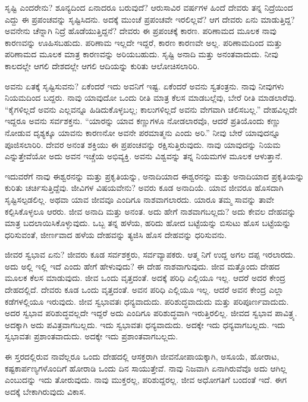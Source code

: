 \vskip 2pt

ಸೃಷ್ಟಿ ಎಂದರೇನು? ಶೂನ್ಯದಿಂದ ಏನಾದರೂ ಬರುವುದೆ? ಆರುಸಾವಿರ ವರ್ಷಗಳ ಹಿಂದೆ ದೇವರು ತನ್ನ ನಿದ್ರೆಯಿಂದ ಎದ್ದು ಈ ಪ್ರಪಂಚವನ್ನು ಸೃಷ್ಟಿಸಿದನು. ಅದಕ್ಕೆ ಮುಂಚೆ ಪ್ರಪಂಚವೇ ಇರಲಿಲ್ಲವೆ? ಆಗ ದೇವರು ಏನು ಮಾಡುತ್ತಿದ್ದ? ಅವನೇನು ಚೆನ್ನಾಗಿ ನಿದ್ರೆ ಹೊಡೆಯುತ್ತಿದ್ದನೆ? ದೇವರು ಈ ಪ್ರಪಂಚಕ್ಕೆ ಕಾರಣ. ಪರಿಣಾಮದ ಮೂಲಕ ನಾವು ಕಾರಣವನ್ನು ಊಹಿಸಬಹುದು. ಪರಿಣಾಮ ಇಲ್ಲದೇ ಇದ್ದರೆ, ಕಾರಣ ಕಾರಣವೇ ಅಲ್ಲ. ಪರಿಣಾಮದಿಂದ ಮತ್ತು ಪರಿಣಾಮದ ಮೂಲಕ ಮಾತ್ರ ಕಾರಣವನ್ನು ಅರಿಯಬಹುದು. ಸೃಷ್ಟಿ ಅನಾದಿ ಮತ್ತು ಅನಂತವಾದುದು. ನೀವು ಕಾಲದಲ್ಲೇ ಆಗಲಿ ದೇಶದಲ್ಲೇ ಆಗಲಿ ಆದಿಯನ್ನು ಕುರಿತು ಆಲೋಚಿಸಲಾರಿರಿ.

\vskip 2pt

ಅವನು ಏತಕ್ಕೆ ಸೃಷ್ಟಿಸುವನು? ಏಕೆಂದರೆ ಇದು ಅವನಿಗೆ ಇಷ್ಟ. ಏಕೆಂದರೆ ಅವನು ಸ್ವತಂತ್ರನು. ನಾವು ನೀವುಗಳು ನಿಯಮದಿಂದ ಬದ್ದರು. ನಾವು ಯಾವುದೋ ಒಂದು ರೀತಿ ಮಾತ್ರ ಕೆಲಸ ಮಾಡಬಲ್ಲೆವು, ಬೇರೆ ರೀತಿ ಮಾಡಲಾರೆವು. “ಕೈಗಳಿಲ್ಲದೆ ಅವನು ಎಲ್ಲವನ್ನೂ ಹಿಡಿದುಕೊಳ್ಳಬಲ್ಲ; ಕಾಲುಗಳಿಲ್ಲದೆ ಅವನು ವೇಗವಾಗಿ ಚಲಿಸಬಲ್ಲ.'' ದೇಹವಿಲ್ಲದೇ ಇದ್ದರೂ ಅವನು ಸರ್ವಶಕ್ತನು. “ಯಾರನ್ನು ಯಾವ ಕಣ್ಣುಗಳೂ ನೋಡಲಾರವೊ, ಆದರೆ ಪ್ರತಿಯೊಂದು ಕಣ್ಣು ನೋಡುವ ದೃಶ್ಯಕ್ಕೂ ಯಾವನು ಕಾರಣನೋ ಅವನೇ ಪರಮಾತ್ಮನು ಎಂದು ಅರಿ.” ನೀವು ಬೇರೆ ಯಾವುದನ್ನೂ ಪೂಜಿಸಲಾರಿರಿ. ದೇವರ ಅನಂತ ಶಕ್ತಿಯು ಈ ಪ್ರಪಂಚವನ್ನು ರಕ್ಷಿಸುತ್ತಿರುವುದು. ನಾವು ಯಾವುದನ್ನು ನಿಯಮ ಎನ್ನುತ್ತೇವೆಯೋ ಅದು ಅವನ ಇಚ್ಚೆಯ ಅಭಿವ್ಯಕ್ತಿ. ಅವನು ವಿಶ್ವವನ್ನು ತನ್ನ ನಿಯಮಗಳ ಮೂಲಕ ಆಳುತ್ತಾನೆ.

\vskip 2pt

ಇದುವರೆಗೆ ನಾವು ಈಶ್ವರನನ್ನು ಮತ್ತು ಪ್ರಕೃತಿಯನ್ನು, ಅನಾದಿಯಾದ ಈಶ್ವರನನ್ನು ಮತ್ತು ಅನಾದಿಯಾದ ಪ್ರಕೃತಿಯನ್ನು ಕುರಿತು ಚರ್ಚಿಸುತ್ತಿದ್ದೆವು. ಜೀವಿಗಳ ವಿಷಯವೇನು? ಅವರು ಕೂಡ ಅನಾದಿಯೆ. ಯಾವ ಜೀವರೂ ಹೊಸದಾಗಿ ಸೃಷ್ಟಿಸಲ್ಪಡಲಿಲ್ಲ. ಅಥವಾ ಯಾವ ಜೀವವೂ ಎಂದಿಗೂ ನಾಶವಾಗಲಾರದು. ಯಾರೂ ತಮ್ಮ ಸಾವನ್ನು ತಾವೇ ಕಲ್ಪಿಸಿಕೊಳ್ಳಲೂ ಆರರು. ಜೀವ ಅನಾದಿ ಮತ್ತು ಅನಂತ. ಅದು ಹೇಗೆ ನಾಶವಾಗಬಲ್ಲದು? ಅದು ಕೇವಲ ದೇಹವನ್ನು ಮಾತ್ರ ಬದಲಾಯಿಸಿಕೊಳ್ಳುವುದು. ಒಬ್ಬ ತನ್ನ ಹಳೆಯ, ಹರಿದು ಹೋದ ಬಟ್ಟೆಯನ್ನು ಬಿಸುಟು ಹೊಸ ಬಟ್ಟೆಯನ್ನು ಧರಿಸುವಂತೆ, ಜೀರ್ಣವಾದ ಹಳೆಯ ದೇಹವನ್ನು ತ್ಯಜಿಸಿ ಹೊಸ ದೇಹವನ್ನು ಧರಿಸುವನು.

ಜೀವರ ಸ್ವಭಾವ ಏನು? ಜೀವರು ಕೂಡ ಸರ್ವಶಕ್ತರು, ಸರ್ವವ್ಯಾಪಕರು. ಆತ್ಮ ನಿಗೆ ಉದ್ದ ಅಗಲ ದಪ್ಪ ಇರಲಾರದು. ಅದು ಅಲ್ಲಿ ಇಲ್ಲಿ ಇದೆ ಎಂದು ಹೇಗೆ ಹೇಳುವುದು? ಈ ದೇಹ ನಾಶವಾಗುವುದು. ಜೀವ ಮತ್ತೊಂದು ದೇಹದ ಮೂಲಕ ಕೆಲಸ ಮಾಡುವುದು. ಜೀವ ಒಂದು ವೃತ್ತದಂತೆ. ಅದಕ್ಕೆ ಪರಿಧಿ ಎಲ್ಲಿಯೂ ಇಲ್ಲ. ಆದರೆ ಅದರ ಕೇಂದ್ರ ದೇಹದಲ್ಲಿದೆ. ದೇವರು ಕೂಡ ಒಂದು ವೃತ್ತದಂತೆ. ಅವನ ಪರಿಧಿ ಎಲ್ಲಿಯೂ ಇಲ್ಲ. ಆದರೆ ಅವನ ಕೇಂದ್ರ ಎಲ್ಲಾ ಕಡೆಗಳಲ್ಲಿಯೂ ಇರುವುದು. ಜೀವ ಸ್ವಭಾವತಃ ಧನ್ಯವಾದುದು. ಪರಿಶುದ್ಧವಾದುದು ಮತ್ತು ಪರಿಪೂರ್ಣವಾದುದು. ಅದರ ಸ್ವಭಾವ ಪರಿಶುದ್ಧವಲ್ಲದೇ ಇದ್ದರೆ ಅದು ಎಂದಿಗೂ ಪರಿಶುದ್ಧವಾಗಿ ಇರುತ್ತಿರಲಿಲ್ಲ. ಜೀವದ ಸ್ವಭಾವ ಪಾವಿತ್ರ್ಯ. ಅದಕ್ಕಾಗಿ ಅದು ಪವಿತ್ರವಾಗಬಲ್ಲದು. ಇದು ಸ್ವಭಾವತಃ ಧನ್ಯವಾದುದು. ಅದಕ್ಕೇ ಇದು ಧನ್ಯವಾಗಬಲ್ಲದು. ಇದು ಸ್ವಭಾವತಃ ಪ್ರಶಾಂತವಾದುದು. ಅದಕ್ಕೇ ಇದು ಪ್ರಶಾಂತವಾಗಬಲ್ಲದು.

ಈ ಸ್ತರದಲ್ಲಿರುವ ನಾವೆಲ್ಲರೂ ಒಂದು ದೇಹದಲ್ಲಿ ಆಸಕ್ತರಾಗಿ ಜೀವನೋಪಾಯಕ್ಕಾಗಿ, ಅಸೂಯೆ, ಹೋರಾಟ, ಕಷ್ಟಕಾರ್ಪಣ್ಯಗಳೊಂದಿಗೆ ಹೋರಾಡಿ ಒಂದು ದಿನ ಸಾಯುತ್ತೇವೆ. ನಾವು ನಿಜವಾಗಿ ಏನಾಗಿರುವೆವೊ ಅದು ಆಗಿಲ್ಲ ಎಂಬುದನ್ನು ಇದು ತೋರುವುದು. ನಾವು ಮುಕ್ತರಲ್ಲ, ಪರಿಶುದ್ದರಲ್ಲ. ಜೀವ ಅಧೋಗತಿಗೆ ಬಂದಂತೆ ಇದೆ. ಈಗ ಅದಕ್ಕೆ ಬೇಕಾಗಿರುವುದು ವಿಕಾಸ.

